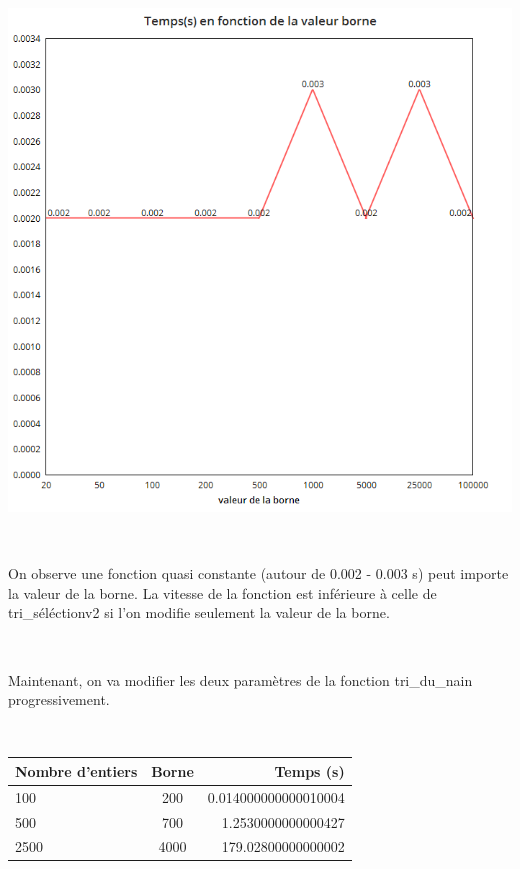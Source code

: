 \documentclass[a4paper, 12pt]{article}
\begin{document}
\begin{center}
\includegraphics[scale=0.25]{tridunainborne.png}
\end{center}
~

On observe une fonction quasi constante (autour de 0.002 - 0.003 s) peut importe la valeur de la borne. La vitesse de la fonction est inférieure à celle de tri\_séléctionv2 si l'on modifie seulement la valeur de la borne.

~

Maintenant, on va modifier les deux paramètres de la fonction tri\_du\_nain progressivement.

~

\begin{table}[htbp]
  \centering
  \begin{tabular}{||l|c|r||}\hline
    \textbf{Nombre d'entiers} & \textbf{Borne} & \textbf{Temps (s)}\\\hline\hline
    100                     &    200                   &   0.014000000000010004            \\\hline
    500                 & 700               &   1.2530000000000427   \\\hline
    2500                 & 4000                 &   179.02800000000002               \\\hline
  \end{tabular}
  \label{tableaunain}
\end{table}
\end{document}

